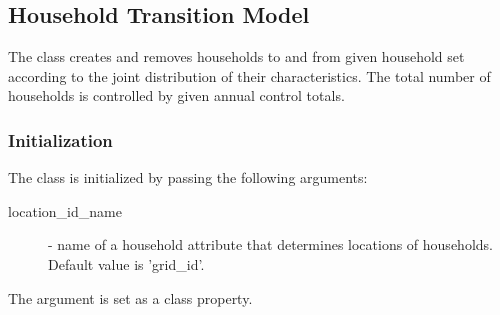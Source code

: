 %
%
\subsection{Household Transition Model}
%
\label{sec:household-transition-model}

The class  
creates and removes households to and from given household set according to
the joint distribution of their characteristics. The total number of
households is controlled by given annual control totals.

\subsubsection{Initialization}
%
The class is initialized by passing the following arguments:
\begin{description}
\item[location_id_name] - name of a household attribute that determines locations of households.
  Default value is 'grid_id'.
\end{description}
The argument is set as a class property.


